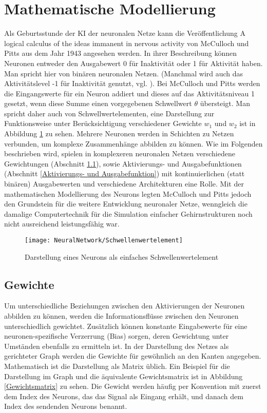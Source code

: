 \section{Mathematische Modellierung} 

Als Geburtsstunde der KI der neuronalen Netze kann die Veröffentlichung \glqq A logical calculus of the ideas 
immanent in nervous activity\grqq \cite{McCulloch:1943} von McCulloch und Pitts aus dem Jahr 1943 angesehen werden. 
In ihrer Beschreibung können Neuronen entweder den Ausgabewert 0 für Inaktivität oder 1 für Aktivität haben. 
Man spricht hier von binären neuronalen Netzen. (Manchmal wird auch das Aktivitätslevel -1 für Inaktivität genutzt, 
vgl. \cite{Ertel:2016}). Bei McCulloch und Pitts werden die Eingangswerte für ein Neuron addiert und dieses auf das 
Aktivitätsniveau 1 gesetzt, wenn diese Summe einen vorgegebenen Schwellwert $\theta$ übersteigt. Man spricht daher 
auch von \glqq Schwellwertelementen\grqq \cite{Kruse:2015}, eine Darstellung zur Funktionsweise unter Berücksichtigung 
verschiedener Gewichte $w_1$ und $w_2$ ist in Abbildung \ref{Schwellenwertelement} zu sehen. Mehrere Neuronen 
werden in Schichten zu Netzen verbunden, um komplexe Zusammenhänge abbilden zu können. Wie im Folgenden beschrieben 
wird, spielen in komplexeren neuronalen Netzen verschiedene Gewichtungen (Abschnitt \ref{Gewichte}), sowie Aktivierungs- 
und Ausgabefunktionen (Abschnitt \ref{Aktivierungs- und Ausgabefunktion}) mit kontinuierlichen (statt binären) Ausgabewerten 
und verschiedene Architekturen eine Rolle. Mit der mathematischen Modellierung des Neurons legten McCulloch und Pitts jedoch 
den Grundstein für die weitere Entwicklung neuronaler Netze, wenngleich die damalige Computertechnik für die Simulation 
einfacher Gehirnstrukturen noch nicht ausreichend leistungsfähig war. \cite{Ertel:2016}

\begin{figure}[H]
	\begin{center}
		\texttt{[image: NeuralNetwork/Schwellenwertelement]}
		\caption{Darstellung eines Neurons als einfaches Schwellenwertelement} 
		\label{Schwellenwertelement}
	\end{center}
\end{figure}

\subsection{Gewichte} \label{Gewichte}
Um unterschiedliche Beziehungen zwischen den Aktivierungen der Neuronen abbilden zu können, werden die 
Informationsflüsse zwischen den Neuronen unterschiedlich gewichtet. Zusätzlich können konstante Eingabewerte 
für eine neuronen-spezifische Verzerrung (Bias) sorgen, deren Gewichtung unter Umständen ebenfalls zu ermitteln ist. \cite{Moeser:2018}
In der Darstellung des Netzes als gerichteter Graph werden die Gewichte für gewöhnlich an den Kanten angegeben. 
Mathematisch ist die Darstellung als Matrix üblich. Ein Beispiel für die Darstellung im Graph und die äquivalente Gewichtsmatrix ist in 
Abbildung \ref{Gewichtsmatrix} zu sehen. Die Gewicht werden häufig per Konvention mit zuerst dem Index des Neurons, das das 
Signal als Eingang erhält, und danach dem Index des sendenden Neurons benannt.

